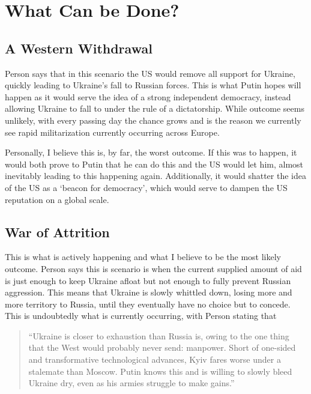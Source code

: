 \documentclass{article}
\begin{document}
\section{What Can be Done?}
    
    \subsection{A Western Withdrawal}
        Person says that in this scenario the US would remove all support for Ukraine, quickly leading to Ukraine's fall to Russian forces. This is what Putin hopes will happen as it would serve the idea of a strong independent democracy, instead allowing Ukraine to fall to under the rule of a dictatorship. While outcome seems unlikely, with every passing day the chance grows and is the reason we currently see rapid militarization currently occurring across Europe. 
        
        Personally, I believe this is, by far, the worst outcome. If this was to happen, it would both prove to Putin that he can do this and the US would let him, almost inevitably leading to this happening again. Additionally, it would shatter the idea of the US as a `beacon for democracy', which would serve to dampen the US reputation on a global scale.

    \subsection{War of Attrition}
        This is what is actively happening and what I believe to be the most likely outcome. Person says this is scenario is when the current supplied amount of aid is just enough to keep Ukraine afloat but not enough to fully prevent Russian aggression. This means that Ukraine is slowly whittled down, losing more and more territory to Russia, until they eventually have no choice but to concede. This is undoubtedly what is currently occurring, with Person stating that
        
        \begin{quote}
            ``Ukraine is closer to exhaustion than Russia is, owing to the one thing that the West would probably never send: manpower. Short of one-sided and transformative technological advances, Kyiv fares worse under a stalemate than Moscow. Putin knows this and is willing to slowly bleed Ukraine dry, even as his armies struggle to make gains.'' \parencite{person_2025}
        \end{quote}
        
\end{document}
